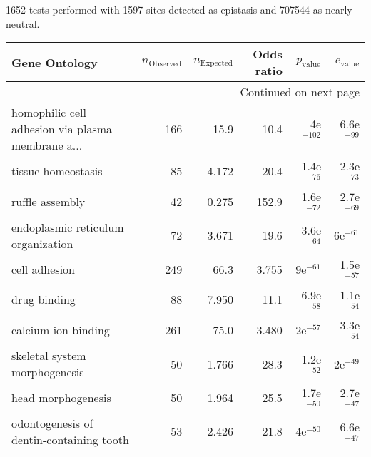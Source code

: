 1652 tests performed with 1597 sites detected as epistasis and 707544 as nearly-neutral.
\scriptsize
\begin{longtable}{lrrrrr}
\toprule
                                     Gene Ontology & $n_{\mathrm{Observed}}$ & $n_{\mathrm{Expected}}$ & Odds ratio & $p_{\mathrm{value}}$ & $e_{\mathrm{value}}$ \\
\midrule
\endhead
\midrule
\multicolumn{6}{r}{{Continued on next page}} \\
\midrule
\endfoot

\bottomrule
\endlastfoot
 homophilic cell adhesion via plasma membrane a... &                     166 &                    15.9 &       10.4 &          4e$^{-102}$ &         6.6e$^{-99}$ \\
                                tissue homeostasis &                      85 &                   4.172 &       20.4 &         1.4e$^{-76}$ &         2.3e$^{-73}$ \\
                                   ruffle assembly &                      42 &                   0.275 &      152.9 &         1.6e$^{-72}$ &         2.7e$^{-69}$ \\
                endoplasmic reticulum organization &                      72 &                   3.671 &       19.6 &         3.6e$^{-64}$ &           6e$^{-61}$ \\
                                     cell adhesion &                     249 &                    66.3 &      3.755 &           9e$^{-61}$ &         1.5e$^{-57}$ \\
                                      drug binding &                      88 &                   7.950 &       11.1 &         6.9e$^{-58}$ &         1.1e$^{-54}$ \\
                               calcium ion binding &                     261 &                    75.0 &      3.480 &           2e$^{-57}$ &         3.3e$^{-54}$ \\
                     skeletal system morphogenesis &                      50 &                   1.766 &       28.3 &         1.2e$^{-52}$ &           2e$^{-49}$ \\
                                head morphogenesis &                      50 &                   1.964 &       25.5 &         1.7e$^{-50}$ &         2.7e$^{-47}$ \\
          odontogenesis of dentin-containing tooth &                      53 &                   2.426 &       21.8 &           4e$^{-50}$ &         6.6e$^{-47}$ \\

\end{longtable}
